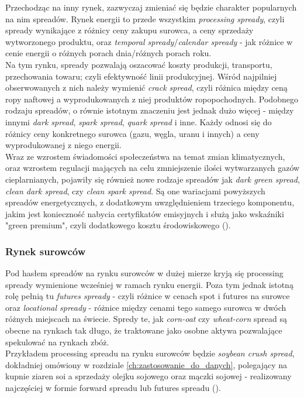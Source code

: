 Przechodząc na inny rynek, zazwyczaj zmieniać się będzie charakter popularnych na nim spreadów. Rynek energii to przede wszystkim \emph{processing spready}, czyli spready wynikające z różnicy ceny zakupu surowca, a ceny sprzedaży wytworzonego produktu, oraz \emph{temporal spready}/\emph{calendar spready} - jak różnice w cenie energii o różnych porach dnia/różnych porach roku.\\
Na tym rynku, spready pozwalają oszacować koszty produkcji, transportu, przechowania towaru; czyli efektywność linii produkcyjnej. Wśród najpilniej obserwowanych z nich należy wymienić \emph{crack spread}, czyli różnica między ceną ropy naftowej a wyprodukowanych z niej produktów ropopochodnych. Podobnego rodzaju spreadów, o równie istotnym znaczeniu jest jednak dużo więcej - między innymi \emph{dark spread}, \emph{spark spread}, \emph{quark spread} i inne. Każdy odnosi się do różnicy ceny konkretnego surowca (gazu, węgla, uranu i innych) a ceny wyprodukowanej z niego energii.\\
Wraz ze wzrostem świadomości społeczeństwa na temat zmian klimatycznych, oraz wzrostem regulacji mających na celu zmniejszenie ilości wytwarzanych gazów cieplarnianych, pojawiły się również nowe rodzaje spreadów jak \emph{dark green spread}, \emph{clean dark spread}, czy \emph{clean spark spread}. Są one wariacjami powyższych spreadów energetycznych, z dodatkowym uwzględnieniem trzeciego komponentu, jakim jest konieczność nabycia certyfikatów emisyjnych i służą jako wskaźniki "green premium", czyli dodatkowego kosztu środowiskowego (\cite{Carmona_Clean_Spreads}).

\subsubsection{Rynek surowców}

Pod hasłem spreadów na rynku surowców w dużej mierze kryją się processing spready wymienione wcześniej w ramach rynku energii. Poza tym jednak istotną rolę pełnią tu \emph{futures spready} - czyli różnice w cenach spot i futures na surowce oraz \emph{locational spready} - różnice między cenami tego samego surowca w dwóch różnych miejscach na świecie. Spredy te, jak \emph{corn-oat} czy \emph{wheat-corn} spread są obecne na rynkach tak długo, że traktowane jako osobne aktywa pozwalające spekulować na rynkach zbóż.\\
Przykładem processing spreadu na rynku surowców będzie \emph{soybean crush spread}, dokładniej omówiony w rozdziale \ref{ch:zastosowanie_do_danych}, polegający na kupnie ziaren soi a sprzedaży olejku sojowego oraz mączki sojowej - realizowany najczęściej w formie forward spreadu lub futures spreadu (\cite{Agro_Spreads}).